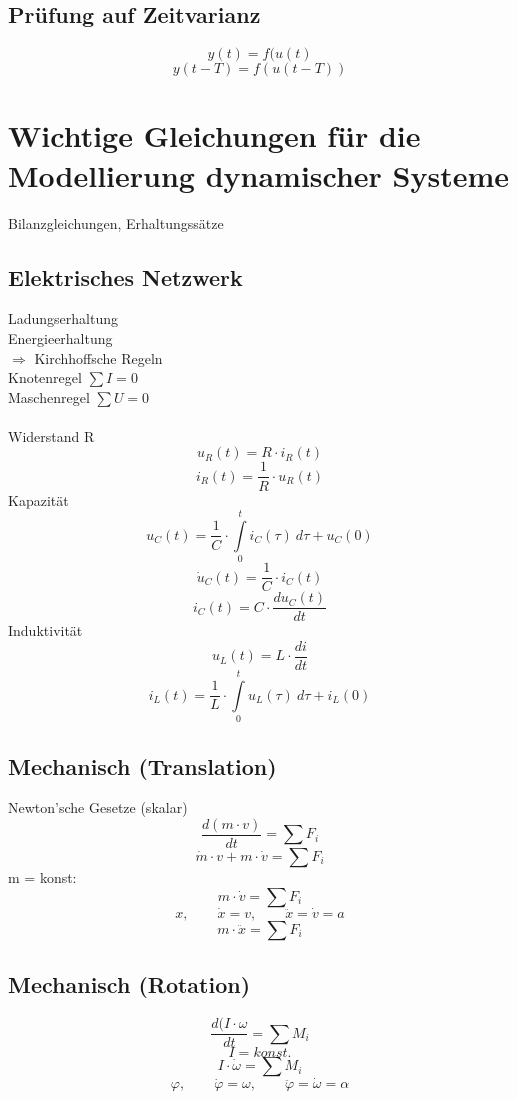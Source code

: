 \subsection{Prüfung auf Zeitvarianz}
\[ y(t) = f(u(t) \]
\[ y(t - T) = f(u(t - T)) \]

\section{Wichtige Gleichungen für die Modellierung dynamischer Systeme}

Bilanzgleichungen, Erhaltungssätze
\subsection{Elektrisches Netzwerk}
Ladungserhaltung \\
Energieerhaltung \\
$\Rightarrow$ Kirchhoffsche Regeln \\
Knotenregel $\sum I = 0$ \\
Maschenregel $\sum U = 0$ \\\\
Widerstand R
\[ \boxed{u_R(t) = R \cdot i_R(t)} \]
\[ \boxed{i_R(t) = \frac{1}{R} \cdot u_R(t)} \]
Kapazität
\[ \boxed{u_C(t) 
= \frac{1}{C} \cdot \int\limits_{0}^{t} i_C(\tau) ~ d\tau + u_C(0)} \]
\[ \boxed{\dot{u}_C(t) = \frac{1}{C} \cdot i_C(t)} \]
\[ \boxed{i_C(t) = C \cdot \frac{d u_C(t)}{d t}} \]
Induktivität
\[ \boxed{u_L(t) = L \cdot \frac{d i}{d t}} \]
\[ \boxed{i_L(t) 
= \frac{1}{L} \cdot \int\limits_{0}^{t} u_L(\tau) ~ d\tau + i_L(0)} \]

\subsection{Mechanisch (Translation)}
Newton'sche Gesetze (skalar)
\[ \boxed{\frac{d(m \cdot v)}{dt} = \sum F_i} \]
\[ \boxed{\dot{m} \cdot v + m \cdot \dot{v} = \sum F_i} \]
m = konst: 
\[ \boxed{m \cdot \dot{v} = \sum F_i} \]
\[ \boxed{x, \qquad \dot{x} = v, \qquad \ddot{x} = \dot{v} = a} \]
\[ \boxed{m \cdot \ddot{x} = \sum F_i} \]

\subsection{Mechanisch (Rotation)}
\[ \boxed{\frac{d(I \cdot \omega}{dt} = \sum M_i} \]
\[ \boxed{I = konst. } \]
\[ \boxed{I \cdot \dot{\omega} = \sum M_i} \]
\[ \boxed{\varphi, \qquad \dot{\varphi} = \omega, 
\qquad \ddot{\varphi} = \dot{\omega} = \alpha} \]


